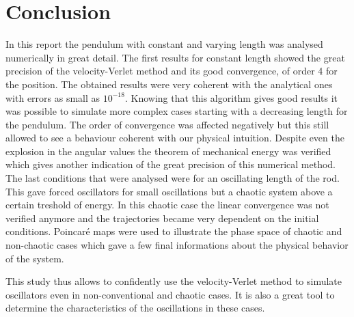 \section{Conclusion}
In this report the pendulum with constant and varying length was analysed numerically in great detail. The first results for constant length showed the great precision of the velocity-Verlet method and its good convergence, of order 4 for the position. The obtained results were very coherent with the analytical ones with errors as small as $10^{-18}$. Knowing that this algorithm gives good results it was possible to simulate more complex cases starting with a decreasing length for the pendulum. The order of convergence was affected negatively but this still allowed to see a behaviour coherent with our physical intuition. Despite even the explosion in the angular values the theorem of mechanical energy was verified which gives another indication of the great precision of this numerical method. The last conditions that were analysed were for an oscillating length of the rod. This gave forced oscillators for small oscillations but a chaotic system above a certain treshold of energy. In this chaotic case the linear convergence was not verified anymore and the trajectories became very dependent on the initial conditions. Poincaré maps were used to illustrate the phase space of chaotic and non-chaotic cases which gave a few final informations about the physical behavior of the system.

This study thus allows to confidently use the velocity-Verlet method to simulate oscillators even in non-conventional and chaotic cases. It is also a great tool to determine the characteristics of the oscillations in these cases.
